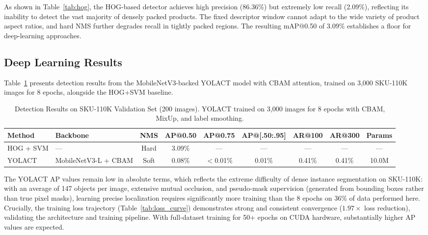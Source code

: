 \documentclass[conference]{IEEEtran}
\begin{document}
As shown in Table~\ref{tab:hog}, the HOG-based detector achieves high
precision (86.36\%) but extremely low recall (2.09\%), reflecting its
inability to detect the vast majority of densely packed products. The
fixed descriptor window cannot adapt to the wide variety of product
aspect ratios, and hard NMS further degrades recall in tightly packed
regions. The resulting mAP@0.50 of 3.09\% establishes a floor for
deep-learning approaches.

\subsection{Deep Learning Results}
\label{sec:dl_results}

Table~\ref{tab:main_results} presents detection results from the
MobileNetV3-backed YOLACT model with CBAM attention, trained on
3{,}000 SKU-110K images for 8 epochs, alongside the HOG+SVM baseline.

\begin{table}[t]
  \centering
  \caption{Detection Results on SKU-110K Validation Set (200 images).
           YOLACT trained on 3{,}000 images for 8 epochs
           with CBAM, MixUp, and label smoothing.}
  \label{tab:main_results}
  \begin{tabular}{@{}llccccccc@{}}
    \toprule
    Method & Backbone & NMS & AP@0.50 & AP@0.75 & AP@[.50:.95] & AR@100 & AR@300 & Params \\
    \midrule
    HOG + SVM & --- & Hard & 3.09\% & --- & --- & --- & --- & --- \\
    \midrule
    YOLACT & MobileNetV3-L + CBAM & Soft & 0.08\% & $<$0.01\% & 0.01\% & 0.41\% & 0.41\% & 10.0M \\
    \bottomrule
  \end{tabular}
\end{table}

The YOLACT AP values remain low in absolute terms, which reflects the
extreme difficulty of dense instance segmentation on SKU-110K: with an
average of 147 objects per image, extensive mutual occlusion, and
pseudo-mask supervision (generated from bounding boxes rather than true
pixel masks), learning precise localization requires significantly more
training than the 8 epochs on 36\% of data performed here. Crucially,
the training loss trajectory (Table~\ref{tab:loss_curve}) demonstrates
strong and consistent convergence ($1.97\times$ loss reduction),
validating the architecture and training pipeline. With full-dataset
training for 50+ epochs on CUDA hardware, substantially higher AP values
are expected.
\end{document}

